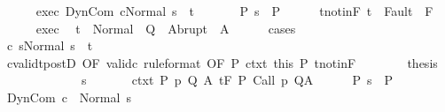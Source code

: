 \begin{isabellebody}
\ \ \ \ \isamarkupfalse%
\ exec{\isacharcolon}\ {\isachardoublequoteopen}{\isasymGamma}{\isasymturnstile}{\isasymlangle}DynCom\ c{\isacharcomma}Normal\ s{\isasymrangle}\ {\isasymRightarrow}\ t{\isachardoublequoteclose}\ \isanewline
\ \ \ \ \isamarkupfalse%
\ P{\isacharcolon}\ {\isachardoublequoteopen}s\ {\isasymin}\ P{\isachardoublequoteclose}\isanewline
\ \ \ \ \isamarkupfalse%
\ t{\isacharunderscore}notin{\isacharunderscore}F{\isacharcolon}\ {\isachardoublequoteopen}t\ {\isasymnotin}\ Fault\ {\isacharbackquote}\ F{\isachardoublequoteclose}\isanewline
\ \ \ \ \isamarkupfalse%
\ exec\ \isamarkupfalse%
\ {\isachardoublequoteopen}t\ {\isasymin}\ Normal\ {\isacharbackquote}\ Q\ {\isasymunion}\ Abrupt\ {\isacharbackquote}\ A{\isachardoublequoteclose}\isanewline
\ \ \ \ \isamarkupfalse%
\ {\isacharparenleft}cases{\isacharparenright}\isanewline
\ \ \ \ \ \ \isamarkupfalse%
\ {\isachardoublequoteopen}{\isasymGamma}{\isasymturnstile}{\isasymlangle}c\ s{\isacharcomma}Normal\ s{\isasymrangle}\ {\isasymRightarrow}\ t{\isachardoublequoteclose}\ \ \ \ \ \ \isanewline
\ \ \ \ \ \ \isamarkupfalse%
\ cvalidt{\isacharunderscore}postD\ {\isacharbrackleft}OF\ valid{\isacharunderscore}c\ {\isacharbrackleft}rule{\isacharunderscore}format{\isacharcomma}\ OF\ P{\isacharbrackright}\ ctxt\ this\ P\ t{\isacharunderscore}notin{\isacharunderscore}F{\isacharbrackright}\isanewline
\ \ \ \ \ \ \isamarkupfalse%
\ {\isacharquery}thesis\ \isacommand{{\isachardot}}\isamarkupfalse%
\isanewline
\ \ \ \ \isamarkupfalse%
\isanewline
\ \ \isamarkupfalse%
\isanewline
\ \ \ \ \isamarkupfalse%
\ s\ \isanewline
\ \ \ \ \isamarkupfalse%
\ ctxt{\isacharcolon}\ {\isachardoublequoteopen}{\isasymforall}{\isacharparenleft}P{\isacharcomma}\ p{\isacharcomma}\ Q{\isacharcomma}\ A{\isacharparenright}{\isasymin}{\isasymTheta}{\isachardot}\ {\isasymGamma}{\isasymTurnstile}\isactrlsub t\isactrlbsub {\isacharslash}F\isactrlesub \ P\ {\isacharparenleft}Call\ p{\isacharparenright}\ Q{\isacharcomma}A{\isachardoublequoteclose}\isanewline
\ \ \ \ \isamarkupfalse%
\ P{\isacharcolon}\ {\isachardoublequoteopen}s\ {\isasymin}\ P{\isachardoublequoteclose}\isanewline
\ \ \ \ \isamarkupfalse%
\ {\isachardoublequoteopen}{\isasymGamma}{\isasymturnstile}DynCom\ c\ {\isasymdown}\ Normal\ s{\isachardoublequoteclose}\isanewline
\ \ \ \ \isamarkupfalse%

\end{isabellebody}
